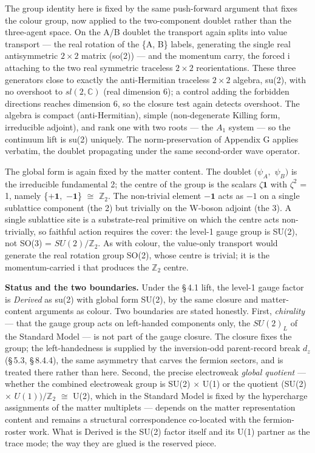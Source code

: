 \documentclass[11pt,oneside]{report}
\theoremstyle{definition}
\theoremstyle{remark}
\begin{document}
The group identity here is fixed by the same push-forward argument that
fixes the colour group, now applied to the two-component doublet rather
than the three-agent space. On the A/B doublet the transport again
splits into value transport --- the real rotation of the \{A, B\}
labels, generating the single real antisymmetric \ensuremath{2\times 2} matrix (so(2)) ---
and the momentum carry, the forced i attaching to the two real symmetric
traceless \ensuremath{2\times 2} reorientations. These three generators close to exactly
the anti-Hermitian traceless \ensuremath{2\times 2} algebra, su(2), with no overshoot to
\ensuremath{sl(2,\mathbb{C})} (real dimension 6); a control adding the forbidden directions
reaches dimension 6, so the closure test again detects overshoot. The
algebra is compact (anti-Hermitian), simple (non-degenerate Killing
form, irreducible adjoint), and rank one with two roots --- the \ensuremath{A_{1}}
system --- so the continuum lift is su(2) uniquely. The
norm-preservation of Appendix G applies verbatim, the doublet
propagating under the same second-order wave operator.

The global form is again fixed by the matter content. The doublet \ensuremath{(\psi_{A},}
\ensuremath{\psi_{B})} is the irreducible fundamental 2; the centre of the group is the
scalars \ensuremath{\zeta \mathbf{1}} with \ensuremath{\zeta^{2}} = 1, namely \{\ensuremath{+\mathbf{1},} \ensuremath{-\mathbf{1}}\} \ensuremath{\cong} \ensuremath{\mathbb{Z}_{2}.} The non-trivial element
\ensuremath{-\mathbf{1}} acts as \ensuremath{-1} on a single sublattice component (the 2) but trivially on
the W-boson adjoint (the 3). A single sublattice site is a
substrate-real primitive on which the centre acts non-trivially, so
faithful action requires the cover: the level-1 gauge group is SU(2),
not SO(3) = \ensuremath{SU(2)/\mathbb{Z}_{2}.} As with colour, the value-only transport would
generate the real rotation group SO(2), whose centre is trivial; it is
the momentum-carried i that produces the \ensuremath{\mathbb{Z}_{2}} centre.

\textbf{Status and the two boundaries.} Under the \S\,4.1 lift, the level-1
gauge factor is \emph{Derived} as su(2) with global form SU(2), by the
same closure and matter-content arguments as colour. Two boundaries are
stated honestly. First, \emph{chirality} --- that the gauge group acts
on left-handed components only, the \ensuremath{SU(2)_{L}} of the Standard Model ---
is not part of the gauge closure. The closure fixes the group; the
left-handedness is supplied by the inversion-odd parent-record break
\ensuremath{d_{z}} (\S\,5.3, \S\,8.4.4), the same asymmetry that carves the fermion sectors,
and is treated there rather than here. Second, the precise electroweak
\emph{global quotient} --- whether the combined electroweak group is
SU(2) \ensuremath{\times} U(1) or the quotient (SU(2) \ensuremath{\times} \ensuremath{U(1))/\mathbb{Z}_{2}} \ensuremath{\cong} U(2), which in the
Standard Model is fixed by the hypercharge assignments of the matter
multiplets --- depends on the matter representation content and remains
a structural correspondence co-located with the fermion-roster work.
What is Derived is the SU(2) factor itself and its U(1) partner as the
trace mode; the way they are glued is the reserved piece.
\end{document}
